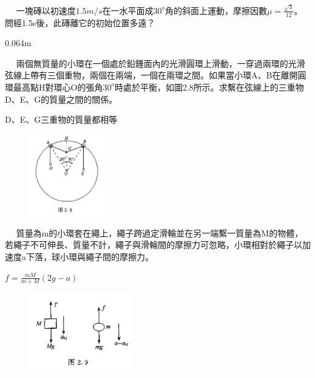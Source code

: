 \documentclass[cn,10pt,math=newtx,chinesefont=founder]{../elegantbook}
\begin{document}
\newpage


\begin{example}　
    一塊磚以初速度$1.5m/s$在一水平面成$30^o$角的斜面上運動，摩擦因數$\mu = \frac{\sqrt{3}}{12}$。問經1.5s後，此磚離它的初始位置多遠？
    
    \rightline{[2.1.8]}
\end{example}

\begin{solution}
0.064m
\end{solution}

\newpage


\begin{example}　
    兩個無質量的小環在一個處於鉛錘面內的光滑圓環上滑動，一穿過兩環的光滑弦線上帶有三個重物，兩個在兩端，一個在兩環之間。如果當小環A、B在離開圓環最高點H對環心O的張角$30^o$時處於平衡，如圖2.8所示。求繫在弦線上的三重物D、E、G的質量之間的關係。
    
    \rightline{[2.1.9]}
\end{example}

\begin{solution}
D、E、G三重物的質量都相等
\end{solution}

\begin{figure}[htbp]
\flushright
\includegraphics[width=0.3\textwidth]{image/2.8.JPG}
\end{figure}

\newpage


\begin{example}　
    質量為m的小環套在繩上，繩子跨過定滑輪並在另一端繫一質量為M的物體，若繩子不可伸長、質量不計，繩子與滑輪間的摩擦力可忽略，小環相對於繩子以加速度a下落，球小環與繩子間的摩擦力。
    
    \rightline{[2.1.10]}
\end{example}

\begin{solution}
$f = \frac{mM}{m+M}(2g-a)$
\end{solution}

\begin{figure}[htbp]
\flushright
\includegraphics[width=0.4\textwidth]{image/2.9.JPG}
\end{figure}
\end{document}

